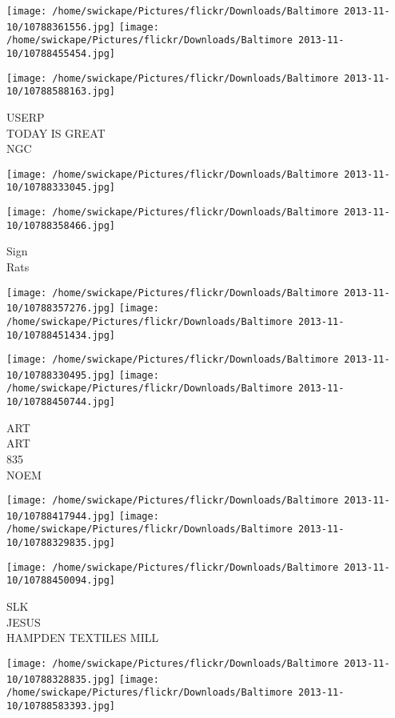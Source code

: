 \documentclass[10pt,letterpaper]{article}
\begin{document}
\texttt{[image: /home/swickape/Pictures/flickr/Downloads/Baltimore 2013-11-10/10788361556.jpg]}
\texttt{[image: /home/swickape/Pictures/flickr/Downloads/Baltimore 2013-11-10/10788455454.jpg]}

\vspace{0.25in}
\texttt{[image: /home/swickape/Pictures/flickr/Downloads/Baltimore 2013-11-10/10788588163.jpg]}

USERP\\
TODAY IS GREAT\\
NGC
\pagebreak

\texttt{[image: /home/swickape/Pictures/flickr/Downloads/Baltimore 2013-11-10/10788333045.jpg]}

\vspace{0.25in}
\texttt{[image: /home/swickape/Pictures/flickr/Downloads/Baltimore 2013-11-10/10788358466.jpg]}

Sign\\
Rats
\pagebreak

\texttt{[image: /home/swickape/Pictures/flickr/Downloads/Baltimore 2013-11-10/10788357276.jpg]}
\texttt{[image: /home/swickape/Pictures/flickr/Downloads/Baltimore 2013-11-10/10788451434.jpg]}

\texttt{[image: /home/swickape/Pictures/flickr/Downloads/Baltimore 2013-11-10/10788330495.jpg]}
\texttt{[image: /home/swickape/Pictures/flickr/Downloads/Baltimore 2013-11-10/10788450744.jpg]}

ART\\
ART\\
835\\
NOEM
\pagebreak

\texttt{[image: /home/swickape/Pictures/flickr/Downloads/Baltimore 2013-11-10/10788417944.jpg]}
\texttt{[image: /home/swickape/Pictures/flickr/Downloads/Baltimore 2013-11-10/10788329835.jpg]}

\vspace{0.25in}
\texttt{[image: /home/swickape/Pictures/flickr/Downloads/Baltimore 2013-11-10/10788450094.jpg]}

SLK\\
JESUS\\
HAMPDEN TEXTILES MILL
\pagebreak

\texttt{[image: /home/swickape/Pictures/flickr/Downloads/Baltimore 2013-11-10/10788328835.jpg]}
\texttt{[image: /home/swickape/Pictures/flickr/Downloads/Baltimore 2013-11-10/10788583393.jpg]}
\end{document}
